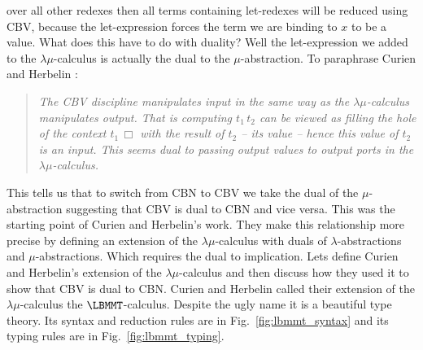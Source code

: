 over all other redexes then all terms containing let-redexes will be
reduced using CBV, because the let-expression forces the term we are
binding to $x$ to be a value.  What does this have to do with duality?
Well the let-expression we added to the $\lambda\mu$-calculus is
actually the dual to the $\mu$-abstraction.  To paraphrase Curien and
Herbelin \cite{Curien:2000}:
\begin{quote}
  \emph{The CBV discipline manipulates input in the same way as the
  $\lambda\mu$-calculus manipulates output.  That is computing
  $t_1\,t_2$ can be viewed as filling the hole of the context
  $t_1\,\Box$ with the result of $t_2$ -- its value -- hence this
  value of $t_2$ is an input.  This seems dual to passing output
  values to output ports in the $\lambda\mu$-calculus.}
\end{quote}
This tells us that to switch from CBN to CBV we take the dual of the
$\mu$-abstraction suggesting that CBV is dual to CBN and vice versa.
This was the starting point of Curien and Herbelin's work.  They make
this relationship more precise by defining an extension of the
$\lambda\mu$-calculus with duals of $\lambda$-abstractions and
$\mu$-abstractions.  Which requires the dual to implication.  Lets
define Curien and Herbelin's extension of the $\lambda\mu$-calculus
and then discuss how they used it to show that CBV is dual to CBN.
Curien and Herbelin called their extension of the $\lambda\mu$-calculus
the $\LBMMT$-calculus.  Despite the ugly name it is a beautiful type
theory.  Its syntax and reduction rules are in
Fig.~\ref{fig:lbmmt_syntax} and its typing rules are in Fig.~\ref{fig:lbmmt_typing}.
